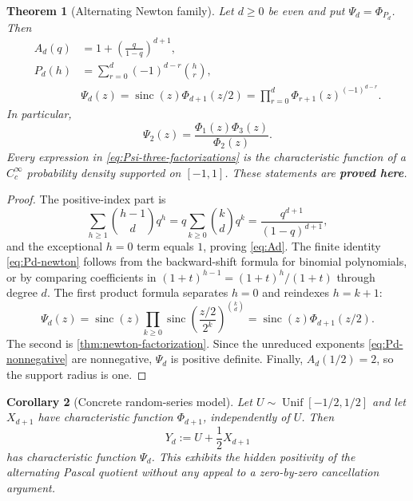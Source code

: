 \documentclass[11pt,oneside]{article}
\numberwithin{equation}{section}
\newtheorem{theorem}{Theorem}[section]
\newtheorem{corollary}[theorem]{Corollary}
\theoremstyle{definition}
\theoremstyle{remark}
\newcommand{\sinc}{\operatorname{sinc}}
\newcommand{\statusproved}{\textcolor{deepgreen}{\textbf{proved here}}}
\begin{document}
\begin{theorem}[Alternating Newton family]
\label{thm:alternating-family}
Let $d\ge0$ be even and put $\Psi_d=\Phi_{P_d}$.  Then
\begin{align}
 A_d(q)
 &=1+\left(\frac q{1-q}\right)^{d+1},
 \label{eq:Ad}\\
 P_d(h)
 &=\sum_{r=0}^{d}(-1)^{d-r}\binom hr,
 \label{eq:Pd-newton}\\
 &\boxed{\Psi_d(z)
 =\sinc(z)\Phi_{d+1}(z/2)
 =\prod_{r=0}^{d}\Phi_{r+1}(z)^{(-1)^{d-r}}.}
 \label{eq:Psi-three-factorizations}
\end{align}
In particular,
\begin{equation}
 \boxed{\Psi_2(z)=\frac{\Phi_1(z)\Phi_3(z)}{\Phi_2(z)}.}
 \label{eq:Psi2-quotient}
\end{equation}
Every expression in \eqref{eq:Psi-three-factorizations} is the characteristic function of
a $C_c^\infty$ probability density supported on $[-1,1]$.  These statements are
\statusproved.
\end{theorem}

\begin{proof}
The positive-index part is
\[
 \sum_{h\ge1}\binom{h-1}{d}q^h
 =q\sum_{k\ge0}\binom kdq^k
 =\frac{q^{d+1}}{(1-q)^{d+1}},
\]
and the exceptional $h=0$ term equals $1$, proving \eqref{eq:Ad}.  The finite identity
\eqref{eq:Pd-newton} follows from the backward-shift formula for binomial polynomials, or by
comparing coefficients in
$(1+t)^{h-1}=(1+t)^h/(1+t)$ through degree $d$.
The first product formula separates $h=0$ and reindexes $h=k+1$:
\[
 \Psi_d(z)=\sinc(z)
 \prod_{k\ge0}\sinc\!\left(\frac{z/2}{2^k}\right)^{\binom kd}
 =\sinc(z)\Phi_{d+1}(z/2).
\]
The second is \cref{thm:newton-factorization}.  Since the unreduced exponents
\eqref{eq:Pd-nonnegative} are nonnegative, $\Psi_d$ is positive definite.  Finally,
$A_d(1/2)=2$, so the support radius is one.
\end{proof}

\begin{corollary}[Concrete random-series model]
\label{cor:Psi-random-model}
Let $U\sim\operatorname{Unif}[-1/2,1/2]$ and let $X_{d+1}$ have characteristic function
$\Phi_{d+1}$, independently of $U$.  Then
\begin{equation}
 Y_d:=U+\frac12X_{d+1}
 \label{eq:Yd-random}
\end{equation}
has characteristic function $\Psi_d$.  This exhibits the hidden positivity of the
alternating Pascal quotient without any appeal to a zero-by-zero cancellation argument.
\end{corollary}
\end{document}
